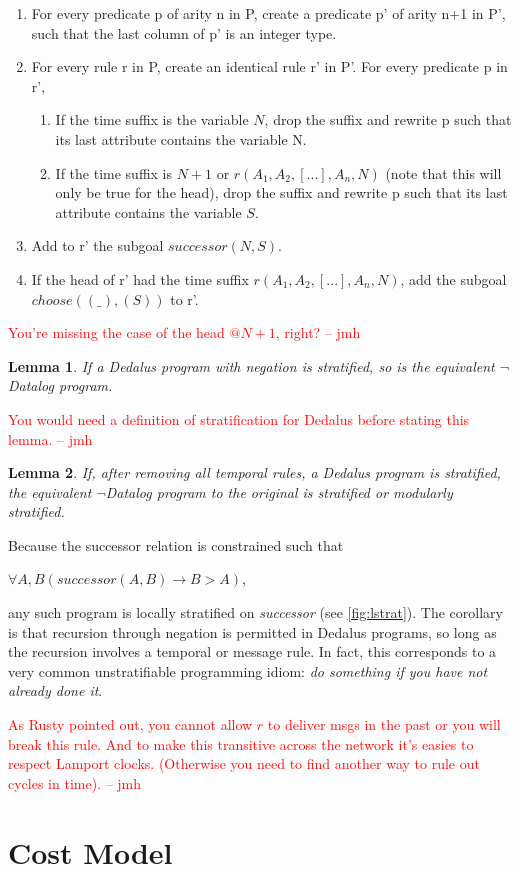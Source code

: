 \documentclass{acm_proc_article-sp-sigmod09}
\newcommand{\jmh}[1]{{\textcolor{red}{#1 -- jmh}}}
\begin{document}
\begin{enumerate}
\item For every predicate p of arity n in P, create a predicate p' of arity n+1 in P', such that the last column of p' is an integer type.
\item For every rule r in P, create an identical rule r' in P'.  For every predicate p in r',  
\begin{enumerate}
	\item If the time suffix is the variable $N$, drop the suffix and rewrite p such that its last attribute contains the variable N.
	\item If the time suffix is $N+1$ or $r(A_{1}, A_{2},[...], A_{n},N)$ (note that this will only be true for the head), drop the suffix
	and rewrite p such that its last attribute contains the variable $S$.
\end{enumerate}
\item Add to r' the subgoal $successor(N, S)$.
\item If the head of r' had the time suffix  $r(A_{1}, A_{2},[...], A_{n},N)$, add the subgoal $choose((\_), (S))$ to r'.

\end{enumerate}
\jmh{You're missing the case of the head $@N+1$, right?}

\newtheorem{lemma}{Lemma}
\begin{lemma}
If a Dedalus program with negation is stratified, so is the equivalent $\lnot$Datalog program.
\end{lemma}
\jmh{You would need a definition of stratification for Dedalus before stating this lemma.}

\begin{lemma}
If, after removing all temporal rules, a Dedalus program is stratified, the equivalent $\lnot$Datalog program to the original
is stratified or modularly stratified.
\end{lemma}

 Because the successor relation is constrained
such that 

$\forall A,B (successor(A, B) \rightarrow B > A)$, 

any such program is locally stratified on \emph{successor} (see \ref{fig:lstrat}).  
The corollary is that recursion through negation
is permitted in Dedalus programs, so long as the recursion involves a temporal or message rule.
In fact, this corresponds to a very common unstratifiable programming idiom: \emph{do something
if you have not already done it}.

\jmh{As Rusty pointed out, you cannot allow $r$ to deliver msgs in the past or you will break this rule.  And to make this transitive across the network it's easies to respect Lamport clocks. (Otherwise you need to find another way to rule out cycles in time).}

\section{Cost Model}
\end{document}
